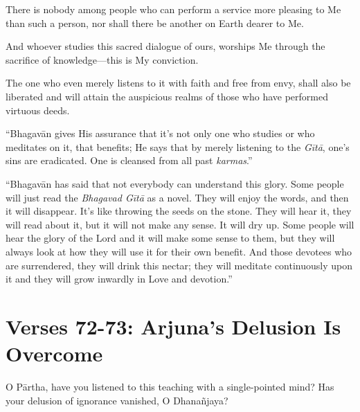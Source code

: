 {There is nobody among people who can perform a service more pleasing to Me than such a person, nor shall there be another on Earth dearer to Me.}

{And whoever studies this sacred dialogue of ours, worships Me through the sacrifice of knowledge---this is My conviction.}

{The one who even merely listens to it with faith and free from envy, shall also be liberated and will attain the auspicious realms of those who have performed virtuous deeds.}

\enquote{Bhagavān gives His assurance that it’s not only one who studies or who meditates on it, that benefits; He says that by merely listening to the \textit{Gītā}, one’s sins are eradicated. One is cleansed from all past \textit{karmas}.}

\enquote{Bhagavān has said that not everybody can understand this glory. Some people will just read the \textit{Bhagavad Gītā} as a novel. They will enjoy the words, and then it will disappear. It’s like throwing the seeds on the stone. They will hear it, they will read about it, but it will not make any sense. It will dry up. Some people will hear the glory of the Lord and it will make some sense to them, but they will always look at how they will use it for their own benefit. And those devotees who are surrendered, they will drink this nectar; they will meditate continuously upon it and they will grow inwardly in Love and devotion.}

\newpage
\section{Verses 72-73: Arjuna's Delusion Is Overcome}\label{sec-verses-72-73-arjuna-s-delusion-is-overcome}

{O Pārtha, have you listened to this teaching with a single-pointed mind? Has your delusion of ignorance vanished, O Dhanañjaya?}

